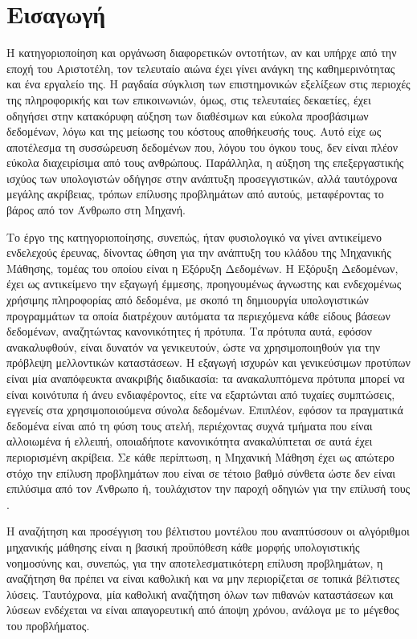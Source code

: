 \chapter{Εισαγωγή}
Η κατηγοριοποίηση και οργάνωση διαφορετικών οντοτήτων, αν και υπήρχε από την εποχή του Αριστοτέλη, τον τελευταίο αιώνα έχει γίνει ανάγκη της καθημερινότητας και ένα εργαλείο της. Η ραγδαία σύγκλιση των επιστημονικών εξελίξεων στις περιοχές της πληροφορικής και των επικοινωνιών, όμως, στις τελευταίες δεκαετίες, έχει οδηγήσει στην κατακόρυφη αύξηση των διαθέσιμων και εύκολα προσβάσιμων δεδομένων, λόγω και της μείωσης του κόστους αποθήκευσής τους. Αυτό είχε ως αποτέλεσμα τη συσσώρευση δεδομένων που, λόγου του όγκου τους, δεν είναι πλέον εύκολα διαχειρίσιμα από τους ανθρώπους. Παράλληλα, η αύξηση της επεξεργαστικής ισχύος των υπολογιστών οδήγησε στην ανάπτυξη προσεγγιστικών, αλλά ταυτόχρονα μεγάλης ακρίβειας, τρόπων επίλυσης προβλημάτων από αυτούς, μεταφέροντας το βάρος από τον Άνθρωπο στη Μηχανή.

Το έργο της κατηγοριοποίησης, συνεπώς, ήταν φυσιολογικό να γίνει αντικείμενο ενδελεχούς έρευνας, δίνοντας ώθηση για την ανάπτυξη του κλάδου της Μηχανικής Μάθησης, τομέας του οποίου είναι η Εξόρυξη Δεδομένων. Η Εξόρυξη Δεδομένων, έχει ως αντικείμενο την εξαγωγή έμμεσης, προηγουμένως άγνωστης και ενδεχομένως χρήσιμης πληροφορίας από δεδομένα, με σκοπό τη δημιουργία υπολογιστικών προγραμμάτων τα οποία διατρέχουν αυτόματα τα περιεχόμενα κάθε είδους βάσεων δεδομένων, αναζητώντας κανονικότητες ή πρότυπα. Τα πρότυπα αυτά, εφόσον ανακαλυφθούν, είναι δυνατόν να γενικευτούν, ώστε να χρησιμοποιηθούν για την πρόβλεψη μελλοντικών καταστάσεων. Η εξαγωγή ισχυρών και γενικεύσιμων προτύπων είναι μία αναπόφευκτα ανακριβής διαδικασία: τα ανακαλυπτόμενα πρότυπα μπορεί να είναι κοινότυπα ή άνευ ενδιαφέροντος, είτε να εξαρτώνται από τυχαίες συμπτώσεις, εγγενείς στα χρησιμοποιούμενα σύνολα δεδομένων. Επιπλέον, εφόσον τα πραγματικά δεδομένα είναι από τη φύση τους ατελή, περιέχοντας συχνά τμήματα που είναι αλλοιωμένα ή ελλειπή, οποιαδήποτε κανονικότητα ανακαλύπτεται σε αυτά έχει περιορισμένη ακρίβεια. Σε κάθε περίπτωση, η Μηχανική Μάθηση έχει ως απώτερο στόχο την επίλυση προβλημάτων που είναι σε τέτοιο βαθμό σύνθετα ώστε δεν είναι επιλύσιμα από τον Άνθρωπο ή, τουλάχιστον την παροχή οδηγιών για την επίλυσή τους \cite{weka}. 

Η αναζήτηση και προσέγγιση του βέλτιστου μοντέλου που αναπτύσσουν οι αλγόριθμοι μηχανικής μάθησης είναι η βασική προϋπόθεση κάθε μορφής υπολογιστικής νοημοσύνης και, συνεπώς, για την αποτελεσματικότερη επίλυση προβλημάτων, η αναζήτηση θα πρέπει να είναι καθολική και να μην περιορίζεται σε τοπικά βέλτιστες λύσεις. Ταυτόχρονα, μία καθολική αναζήτηση όλων των πιθανών καταστάσεων και λύσεων ενδέχεται να είναι απαγορευτική από άποψη χρόνου, ανάλογα με το μέγεθος του προβλήματος.

